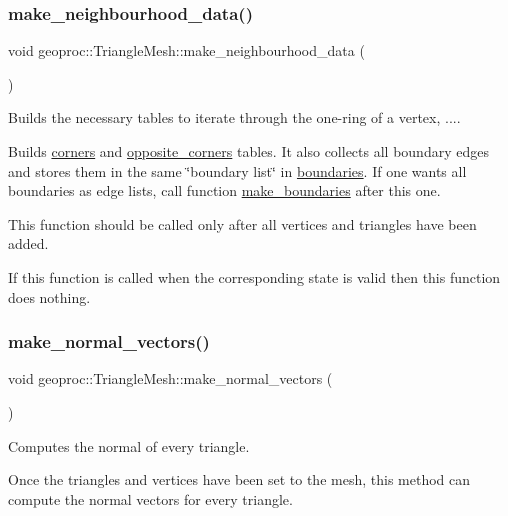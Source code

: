 \subsubsection{\texorpdfstring{make\+\_\+neighbourhood\+\_\+data()}{make\_neighbourhood\_data()}}
{\footnotesize\ttfamily void geoproc\+::\+Triangle\+Mesh\+::make\+\_\+neighbourhood\+\_\+data (\begin{DoxyParamCaption}{ }\end{DoxyParamCaption})}



Builds the necessary tables to iterate through the one-\/ring of a vertex, .... 

Builds \hyperlink{classgeoproc_1_1TriangleMesh_ab9610d614e081deb28010d237fecd55b}{corners} and \hyperlink{classgeoproc_1_1TriangleMesh_a2604795c90c694116513252b86d242b4}{opposite\+\_\+corners} tables. It also collects all boundary edges and stores them in the same \char`\"{}boundary list\char`\"{} in \hyperlink{classgeoproc_1_1TriangleMesh_a57162eac37831c87786a8dab8331d72f}{boundaries}. If one wants all boundaries as edge lists, call function \hyperlink{classgeoproc_1_1TriangleMesh_ad11c9406e2677e4d72d53837206fd769}{make\+\_\+boundaries} after this one.

This function should be called only after all vertices and triangles have been added.

If this function is called when the corresponding state is valid then this function does nothing. \mbox{\label{classgeoproc_1_1TriangleMesh_a638f0267d7d8e51498330e414fa25bfe}} 
\subsubsection{\texorpdfstring{make\+\_\+normal\+\_\+vectors()}{make\_normal\_vectors()}}
{\footnotesize\ttfamily void geoproc\+::\+Triangle\+Mesh\+::make\+\_\+normal\+\_\+vectors (\begin{DoxyParamCaption}{ }\end{DoxyParamCaption})}



Computes the normal of every triangle. 

Once the triangles and vertices have been set to the mesh, this method can compute the normal vectors for every triangle.

